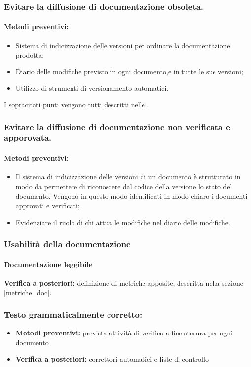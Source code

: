 \documentclass[12pt,a4paper]{article}
\begin{document}
\subsubsection {Evitare la diffusione di documentazione obsoleta.} 
\paragraph{Metodi preventivi:}
\begin{itemize}
	\item Sistema di indicizzazione delle versioni  per ordinare la documentazione prodotta;
	\item Diario delle modifiche previsto in ogni documento,e in tutte le sue versioni;
	\item Utilizzo di strumenti di versionamento automatici.
\end{itemize}
I sopracitati punti vengono tutti descritti nelle \NdP{}.

\subsubsection{Evitare la diffusione di documentazione non verificata e apporovata.}
\paragraph{Metodi preventivi:}
\begin{itemize}
	\item Il sistema di indicizzazione delle versioni di un documento è strutturato in modo da permettere di riconoscere dal codice della versione lo stato del documento. Vengono in questo modo identificati in modo chiaro i documenti approvati e verificati;
	\item Evidenziare il ruolo di chi attua le modifiche nel diario delle modifiche.
\end{itemize}


\subsubsection{Usabilità della documentazione}
\paragraph{Documentazione leggibile}
\textbf{Verifica a posteriori:}  definizione di metriche apposite, descritta nella sezione \ref{metriche_doc}.

\subsubsection{Testo grammaticalmente corretto:}
\begin{itemize}
	\item \textbf{Metodi preventivi:} prevista attività di verifica a fine stesura per ogni documento
	\item \textbf{Verifica a posteriori:} correttori automatici e liste di controllo
\end{itemize}
\end{document}
